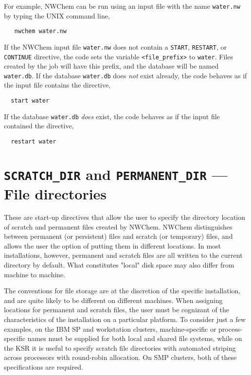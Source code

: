 For example, NWChem can be run using an input file with the name 
\verb+water.nw+ 
by typing the UNIX command line,

\begin{verbatim}
   nwchem water.nw
\end{verbatim}

If the NWChem input file \verb+water.nw+ does not contain
a \verb+START+, \verb+RESTART+, or \verb+CONTINUE+ directive, the code
sets the variable {\tt <file\_prefix>} to {\tt water}.  Files created
by the job will have this prefix, and the database will be named
{\tt water.db}.  If the database \verb+water.db+ does {\em not} exist already,
the code behaves as if the input file contains the directive,

\begin{verbatim}
  start water
\end{verbatim}

If the database \verb+water.db+ {\em does} exist,
the code behaves as if the input file contained the directive,

\begin{verbatim}
  restart water
\end{verbatim}


\section{{\tt SCRATCH\_DIR} and {\tt PERMANENT\_DIR} --- File directories}
\label{sec:dirs}

These are start-up directives that allow the user to specify the
directory location of scratch and permanent files created by NWChem.
NWChem distinguishes between permanent (or persistent) files and
scratch (or temporary) files, and allows the user the option of
putting them in different locations.  In most installations, however,
permanent and scratch files are all written to the current directory
by default.  What constitutes "local" disk space may also differ from 
machine to machine.

The conventions for file storage are at the discretion of the specific 
installation, and are quite likely to be different on different machines.  
When assigning locations for permanent and
scratch files,
the user must be cognizant of the characteristics of the installation
on a particular platform.
To consider just a few examples, on the IBM SP 
and workstation clusters, machine-specific or process-specific
names must be supplied for both local and shared file
systems, while on the KSR it is useful to specify scratch file directories
with automated striping across processors with round-robin allocation.
On SMP clusters, both of these specifications are required.  

